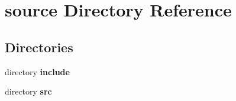 \section{source Directory Reference}
\label{dir_b2f33c71d4aa5e7af42a1ca61ff5af1b}
\subsection*{Directories}
\begin{DoxyCompactItemize}
\item 
directory {\bf include}
\item 
directory {\bf src}
\end{DoxyCompactItemize}
